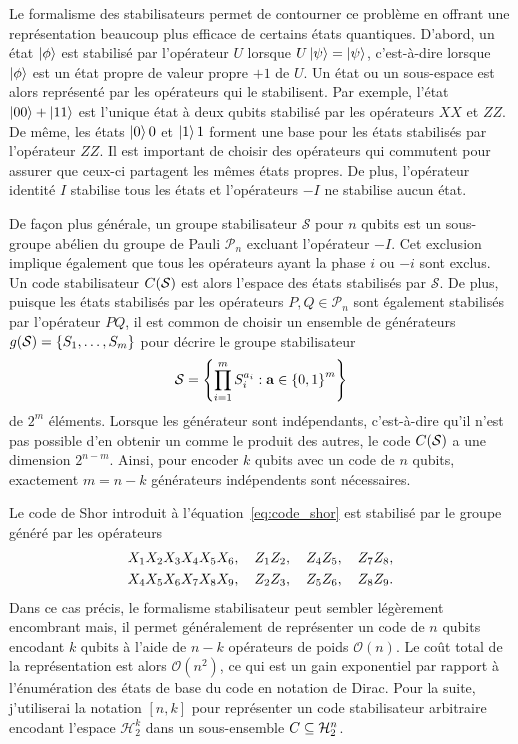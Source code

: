Le formalisme des stabilisateurs permet de contourner ce problème en offrant une 
représentation beaucoup plus efficace de certains états quantiques.
D'abord,
un état $\ket\phi$ est stabilisé par l'opérateur $U$ lorsque $U\ket\psi = \ket\psi$,
c'est-à-dire lorsque $\ket \phi$ est un état propre de valeur propre $+1$ de $U$.
Un état ou un sous-espace est alors représenté par les opérateurs qui le stabilisent.
Par exemple,
l'état $\ket{00} + \ket{11}$ est l'unique état à deux qubits stabilisé par 
les opérateurs $XX$ et $ZZ$. 
De même,
les états $\ket 00$ et $\ket 11$ forment une base
pour les états stabilisés par l'opérateur $ZZ$.
Il est important de choisir des opérateurs qui commutent pour assurer 
que ceux-ci partagent les mêmes états propres.
De plus, l'opérateur identité $I$ stabilise tous les états et l'opérateurs
$-I$ ne stabilise aucun état.

De façon plus générale,
un groupe stabilisateur $\mathcal S$ pour $n$ qubits est un sous-groupe abélien 
du groupe de Pauli $\mathcal P_n$ excluant l'opérateur $-I$.
Cet exclusion implique également que tous les opérateurs ayant la phase $i$ ou $-i$ sont exclus.
Un code stabilisateur $C(\mathcal S)$ est alors l'espace des états stabilisés par $\mathcal S$.
De plus,
puisque les états stabilisés par les opérateurs $P, Q \in \mathcal P_n$ sont également
stabilisés par l'opérateur $PQ$,
il est common de choisir un ensemble de générateurs $g(\mathcal S) = \qty{S_1, \ldots, S_m}$
pour décrire le groupe stabilisateur
\begin{align}
  \mathcal S = 
  \qty{
    \prod_{i=1}^m S_i^{a_i} : \vb a \in \qty{0, 1}^m
  }
\end{align}
de $2^m$ éléments.
Lorsque les générateur sont indépendants,
c'est-à-dire qu'il n'est pas possible d'en obtenir un comme le produit des autres,
le code $C(\mathcal S)$ a une dimension $2^{n - m}$.
Ainsi, 
pour encoder $k$ qubits avec un code de $n$ qubits,
exactement $m = n - k$ générateurs indépendents sont nécessaires.

Le code de Shor introduit à l'équation~\eqref{eq:code_shor} est stabilisé
par le groupe généré par les opérateurs 
\begin{gather}
    X_1 X_2 X_3 X_4 X_5 X_6, \quad
    Z_1 Z_2, \quad Z_4 Z_5, \quad Z_7 Z_8, \notag \\
    X_4 X_5 X_6 X_7 X_8 X_9, \quad
    Z_2 Z_3, \quad Z_5 Z_6, \quad Z_8 Z_9.
\end{gather}
Dans ce cas précis,
le formalisme stabilisateur peut sembler légèrement encombrant mais,
il permet généralement de représenter un code de $n$ qubits encodant $k$ qubits
à l'aide de $n - k$ opérateurs de poids $\mathcal O(n)$.
Le coût total de la représentation est alors $\mathcal O(n^2)$, ce qui est un gain exponentiel
par rapport à l'énumération des états de base du code en notation de Dirac.
Pour la suite,
j'utiliserai la notation $[n, k]$ pour représenter un code stabilisateur arbitraire 
encodant l'espace $\mathcal H_2^k$ dans un sous-ensemble $C \subseteq \mathcal H_2^n$.


